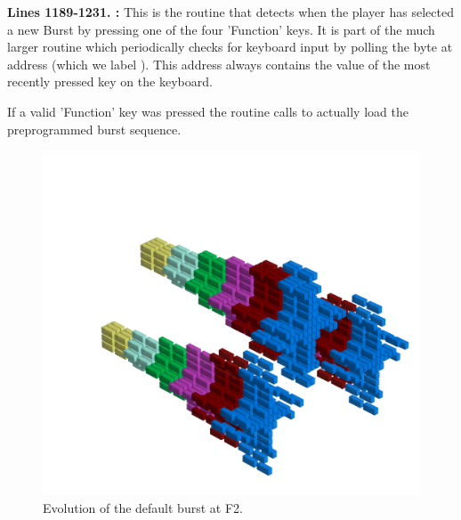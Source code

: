 \textbf{Lines 1189-1231. :} This is the routine that detects when the player has selected a new
Burst by pressing one of the four 'Function' keys. It is part of the much larger routine  which periodically checks
for keyboard input by polling the byte at address  (which we label ). This address always
contains the value of the most recently pressed key on the keyboard.

If a valid 'Function' key was pressed the routine calls  to actually load the preprogrammed burst sequence.

\clearpage
\begin{figure}[H]
    \centering
    \begin{adjustbox}{width=12cm,center}
      \includegraphics[width=12cm]{src/patterns/bursts/pattern1-45.png}%
    \end{adjustbox}
\caption{Evolution of the default burst at F2.}
\end{figure}
\clearpage

